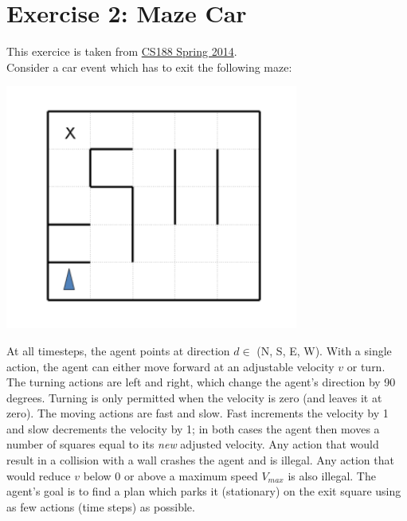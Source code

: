 \documentclass[9pt,a4paper]{extarticle}
\begin{document}
   \section*{Exercise 2: Maze Car}
This exercice is taken from \href{http://ai.berkeley.edu/sections/section_1_0hzy6TFupb1Z3bckfRXdC5KYpsdZOE.pdf}{CS188 Spring 2014}.\\
Consider a car event which has to exit the following maze:
\\
\begin{center}
   \includegraphics[scale=1]{figures/tp1_maze.png}
\end{center}
At all timesteps, the agent points at direction $d \in$ (N, S, E, W). With a single action, the agent
can either move forward at an adjustable velocity $v$ or turn. The turning actions are left and right, which change
the agent’s direction by 90 degrees. Turning is only permitted when the velocity is zero (and leaves it at zero).
The moving actions are fast and slow. Fast increments the velocity by 1 and slow decrements the velocity by 1;
in both cases the agent then moves a number of squares equal to its \textit{new} adjusted velocity. Any action that
would result in a collision with a wall crashes the agent and is illegal. Any action that would reduce $v$ below 0
or above a maximum speed $V_{max}$ is also illegal. The agent’s goal is to find a plan which parks it (stationary)
on the exit square using as few actions (time steps) as possible.
\end{document}
